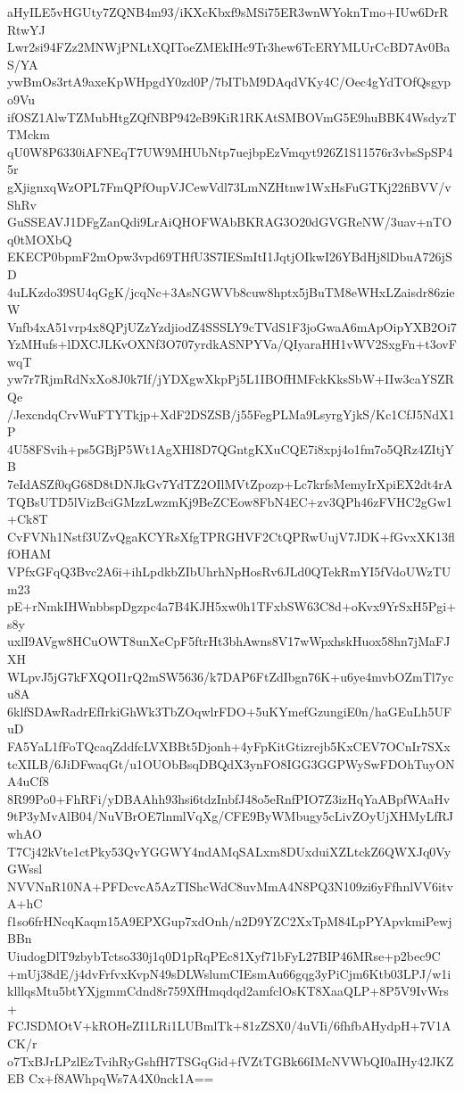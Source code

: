 aHyILE5vHGUty7ZQNB4m93/iKXcKbxf9sMSi75ER3wnWYoknTmo+IUw6DrRRtwYJ
Lwr2si94FZz2MNWjPNLtXQIToeZMEkIHc9Tr3hew6TcERYMLUrCcBD7Av0BaS/YA
ywBmOs3rtA9axeKpWHpgdY0zd0P/7bITbM9DAqdVKy4C/Oec4gYdTOfQsgypo9Vu
ifOSZ1AlwTZMubHtgZQfNBP942eB9KiR1RKAtSMBOVmG5E9huBBK4WsdyzTTMckm
qU0W8P6330iAFNEqT7UW9MHUbNtp7uejbpEzVmqyt926Z1S11576r3vbsSpSP45r
gXjignxqWzOPL7FmQPfOupVJCewVdl73LmNZHtnw1WxHsFuGTKj22fiBVV/vShRv
GuSSEAVJ1DFgZanQdi9LrAiQHOFWAbBKRAG3O20dGVGReNW/3uav+nTOq0tMOXbQ
EKECP0bpmF2mOpw3vpd69THfU3S7IESmItI1JqtjOIkwI26YBdHj8lDbuA726jSD
4uLKzdo39SU4qGgK/jcqNc+3AsNGWVb8cuw8hptx5jBuTM8eWHxLZaisdr86zieW
Vnfb4xA51vrp4x8QPjUZzYzdjiodZ4SSSLY9cTVdS1F3joGwaA6mApOipYXB2Oi7
YzMHufs+lDXCJLKvOXNf3O707yrdkASNPYVa/QIyaraHH1vWV2SxgFn+t3ovFwqT
yw7r7RjmRdNxXo8J0k7If/jYDXgwXkpPj5L1IBOfHMFckKksSbW+IIw3caYSZRQe
/JexcndqCrvWuFTYTkjp+XdF2DSZSB/j55FegPLMa9LsyrgYjkS/Kc1CfJ5NdX1P
4U58FSvih+ps5GBjP5Wt1AgXHI8D7QGntgKXuCQE7i8xpj4o1fm7o5QRz4ZItjYB
7eIdASZf0qG68D8tDNJkGv7YdTZ2OIlMVtZpozp+Lc7krfsMemyIrXpiEX2dt4rA
TQBsUTD5lVizBciGMzzLwzmKj9BeZCEow8FbN4EC+zv3QPh46zFVHC2gGw1+Ck8T
CvFVNh1Nstf3UZvQgaKCYRsXfgTPRGHVF2CtQPRwUujV7JDK+fGvxXK13flfOHAM
VPfxGFqQ3Bvc2A6i+ihLpdkbZIbUhrhNpHosRv6JLd0QTekRmYI5fVdoUWzTUm23
pE+rNmkIHWnbbspDgzpc4a7B4KJH5xw0h1TFxbSW63C8d+oKvx9YrSxH5Pgi+s8y
uxlI9AVgw8HCuOWT8unXeCpF5ftrHt3bhAwns8V17wWpxhskHuox58hn7jMaFJXH
WLpvJ5jG7kFXQOI1rQ2mSW5636/k7DAP6FtZdIbgn76K+u6ye4mvbOZmTl7ycu8A
6klfSDAwRadrEfIrkiGhWk3TbZOqwlrFDO+5uKYmefGzungiE0n/haGEuLh5UFuD
FA5YaL1fFoTQcaqZddfcLVXBBt5Djonh+4yFpKitGtizrejb5KxCEV7OCnIr7SXx
tcXILB/6JiDFwaqGt/u1OUObBsqDBQdX3ynFO8IGG3GGPWySwFDOhTuyONA4uCf8
8R99Po0+FhRFi/yDBAAhh93hsi6tdzInbfJ48o5eRnfPIO7Z3izHqYaABpfWAaHv
9tP3yMvAlB04/NuVBrOE7lnmlVqXg/CFE9ByWMbugy5cLivZOyUjXHMyLfRJwhAO
T7Cj42kVte1ctPky53QvYGGWY4ndAMqSALxm8DUxduiXZLtckZ6QWXJq0VyGWssl
NVVNnR10NA+PFDcvcA5AzTIShcWdC8uvMmA4N8PQ3N109zi6yFfhnlVV6itvA+hC
f1so6frHNcqKaqm15A9EPXGup7xdOnh/n2D9YZC2XxTpM84LpPYApvkmiPewjBBn
UiudogDlT9zbybTctso330j1q0D1pRqPEc81Xyf71bFyL27BIP46MRse+p2bec9C
+mUj38dE/j4dvFrfvxKvpN49sDLWslumCIEsmAu66gqg3yPiCjm6Ktb03LPJ/w1i
klllqsMtu5btYXjgmmCdnd8r759XfHmqdqd2amfclOsKT8XaaQLP+8P5V9IvWrs+
FCJSDMOtV+kROHeZI1LRi1LUBmlTk+81zZSX0/4uVIi/6fhfbAHydpH+7V1ACK/r
o7TxBJrLPzlEzTvihRyGshfH7TSGqGid+fVZtTGBk66IMcNVWbQI0aIHy42JKZEB
Cx+f8AWhpqWs7A4X0nck1A==
